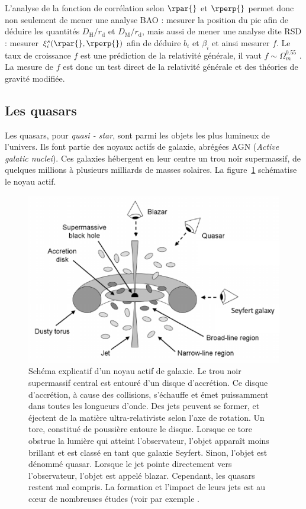 L'analyse de la fonction de corrélation selon $\rpar{}$ et $\rperp{}$ permet donc non seulement de mener une analyse BAO : mesurer la position du pic afin de déduire les quantités $D_{\mathrm{H}} / r_{\mathrm{d}}$ et $D_{\mathrm{M}} / r_{\mathrm{d}}$, mais aussi de mener une analyse dite RSD : mesurer $\xi_i^s(\rpar{}, \rperp{})$ afin de déduire $b_i$ et $\beta_i$ et ainsi mesurer $f$. Le taux de croissance $f$ est une prédiction de la relativité générale, il vaut $f \sim \Omega_{m}^{\num{0.55}}$ \autocite{Linder2007}. La mesure de $f$ est donc un test direct de la relativité générale et des théories de gravité modifiée.

\subsection{Les quasars}
Les quasars, pour \emph{quasi - star}, sont parmi les objets les plus lumineux de l'univers. Ils font partie des noyaux actifs de galaxie, abrégées AGN (\emph{Active galatic nuclei}). Ces galaxies hébergent en leur centre un trou noir supermassif, de quelques millions à plusieurs milliards de masses solaires. La figure~\ref{fig:schema_qso} schématise le noyau actif. 
\begin{figure}
  \centering
  \includegraphics[scale=0.68]{schema_qso2}
  \caption{Schéma explicatif d'un noyau actif de galaxie. Le trou noir supermassif central est entouré d'un disque d'accrétion. Ce disque d'accrétion, à cause des collisions, s'échauffe et émet puissamment dans toutes les longueurs d'onde. Des jets peuvent se former, et éjectent de la matière ultra-relativiste selon l'axe de rotation. Un tore, constitué de poussière entoure le disque. Lorsque ce tore obstrue la lumière qui atteint l'observateur, l'objet apparaît moins brillant et est classé en tant que galaxie Seyfert.  Sinon, l'objet est dénommé quasar. Lorsque le jet pointe directement vers l'observateur, l'objet est appelé blazar.
  Cependant, les quasars restent mal compris. La formation et l'impact de leurs jets est au c{\oe}ur de nombreuses études (voir par exemple \textcite{Chabanier2020}.}
  \label{fig:schema_qso}
\end{figure}
